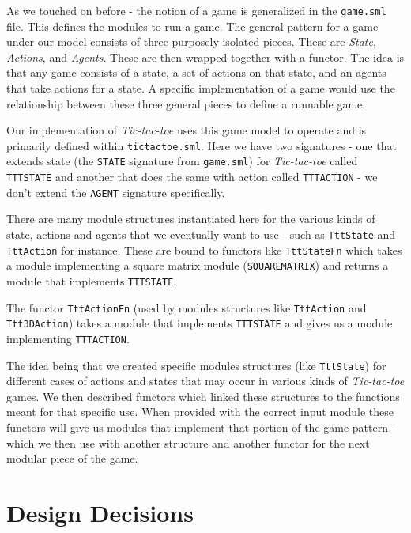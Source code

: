 \documentclass[9pt,letterpaper]{extarticle}
\begin{document}
  As we touched on before - the notion of a game is generalized in the
  \texttt{game.sml} file. This defines the modules to run a game.
  The general pattern for a game under our model consists of three purposely
  isolated pieces.
  These are \textit{State}, \textit{Actions}, and \textit{Agents}.
  These are then wrapped together with a functor. The idea is that any game
  consists of a state, a set of actions on that state, and an agents that take
  actions for a state. A specific implementation of a game would use the
  relationship between these three general pieces to define a runnable game.

  Our implementation of \textit{Tic-tac-toe} uses this game model to operate and
  is primarily defined within \texttt{tictactoe.sml}.
  Here we have two signatures - one that extends state (the \texttt{STATE}
  signature from \texttt{game.sml}) for \textit{Tic-tac-toe}
  called \texttt{TTTSTATE} and another that does the same with action called
  \texttt{TTTACTION} - we don't extend the \texttt{AGENT} signature specifically.

  There are many module structures instantiated here for the various kinds of
  state, actions and agents that we eventually want to use -
  such as \texttt{TttState} and \texttt{TttAction} for instance.
  These are bound to functors like \texttt{TttStateFn} which takes
  a module implementing a square matrix module (\texttt{SQUAREMATRIX})
  and returns a module that implements \texttt{TTTSTATE}.
  
  The functor \texttt{TttActionFn} (used by modules structures like
  \texttt{TttAction} and \texttt{Ttt3DAction}) takes a module that implements
  \texttt{TTTSTATE} and gives us a module implementing \texttt{TTTACTION}.
  
  The idea being that we created specific modules structures
  (like \texttt{TttState}) for different
  cases of actions and states that may occur in various kinds of
  \textit{Tic-tac-toe} games. We then described functors
  which linked these structures to the functions meant for that specific use.
  When provided with the correct input module these functors will give us
  modules that implement that portion of the game pattern - which we then use
  with another structure and another functor for the next modular piece of the
  game.

	\section{Design Decisions}
\end{document}
